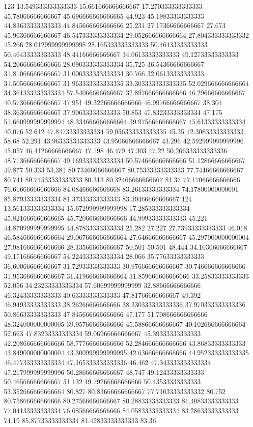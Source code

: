 123 13.549333333333333 15.661666666666667 17.270333333333333 45.78066666666667 45.696666666666665 44.923 45.19833333333333 44.83633333333333 44.845666666666666 25.231 27.17366666666667 27.673 45.96366666666667 46.547333333333334 29.052666666666664 27.804333333333332 45.266 28.012999999999998 28.165333333333333 50.46433333333333 50.46433333333333 48.44166666666667 34.06133333333333 49.12733333333333 54.20666666666666 28.090333333333334 35.725 36.54366666666667 31.81066666666667 31.000333333333334 30.766 32.06133333333333 31.50566666666667 31.963333333333335 33.303333333333335 52.029666666666664 34.361333333333334 57.54066666666667 32.897666666666666 46.29666666666667 40.57366666666667 47.951 49.32266666666666 46.99766666666667 38.304 38.36366666666667 37.90633333333333 50.853 47.83233333333334 47.175 51.660999999999994 48.334666666666664 39.97566666666667 45.61333333333334 40.076 52.612 47.84733333333334 59.056333333333335 45.35 42.30833333333333 58.68 52.291 43.96333333333333 43.95066666666667 43.296 42.592999999999996 45.057 46.41266666666667 47.198 46.479 47.303 47.22 50.266333333333336 48.71366666666667 49.169333333333334 50.574666666666666 51.12866666666667 49.877 50.333 53.381 80.73466666666667 80.75333333333333 77.74466666666667 80.741 80.74533333333333 80.313 80.32466666666667 81.37 77.17066666666666 76.61666666666666 84.08466666666668 83.26133333333334 74.17800000000001 85.87933333333334 81.37333333333333 83.39466666666667
124 13.561333333333334 15.672999999999998 17.285333333333334 45.821666666666665 45.720666666666666 44.99933333333333 45.221 44.870999999999995 44.87833333333333 25.282 27.227 27.73933333333333 46.018 46.584666666666664 29.067666666666664 27.64666666666667 45.297000000000004 27.981666666666666 28.13566666666667 50.501 50.501 48.444 34.10366666666667 49.17166666666667 54.224333333333334 28.066 35.77633333333333 36.60066666666667 31.72933333333333 30.976666666666667 30.746666666666666 31.953666666666667 31.419666666666664 31.859666666666666 33.25833333333333 52.056 34.23233333333334 57.60699999999999 32.88666666666666 46.32433333333333 40.63333333333333 47.81766666666667 49.392 46.94933333333333 38.26266666666666 38.330333333333336 37.970333333333336 50.86633333333333 47.845666666666666 47.177 51.708666666666666 48.324000000000005 39.95766666666666 45.58866666666667 40.102666666666664 52.663 47.83233333333334 59.06966666666667 45.39333333333333 42.208666666666666 58.77766666666666 52.284666666666666 43.86833333333333 43.849000000000004 43.300999999999995 42.63666666666666 44.952333333333335 46.477333333333334 47.165333333333336 46.462 47.343333333333334 47.217999999999996 50.28666666666667 48.747 49.12433333333333 50.46566666666667 51.132 49.79266666666666 50.43533333333333 53.352666666666664 80.827 80.83666666666667 77.71033333333332 80.752 80.75866666666666 80.27566666666667 80.28833333333333 81.40833333333333 77.04133333333334 76.68566666666666 84.05833333333334 83.28633333333333 74.19 85.87733333333334 81.42833333333333 83.36
